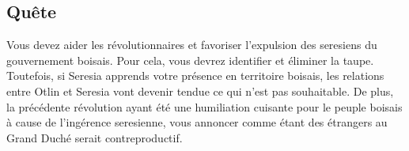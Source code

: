 \documentclass[french, a4paper, 12pt]{article}
\begin{document}
\subsection{Quête}

Vous devez aider les révolutionnaires et favoriser l'expulsion des seresiens du gouvernement boisais. Pour cela, vous devrez identifier et éliminer la taupe. Toutefois, si Seresia apprends votre présence en territoire boisais, les relations entre Otlin et Seresia vont devenir tendue ce qui n'est pas souhaitable. De plus, la précédente révolution ayant été une humiliation cuisante pour le peuple boisais à cause de l'ingérence seresienne, vous annoncer comme étant des étrangers au Grand Duché serait contreproductif.
\end{document}
